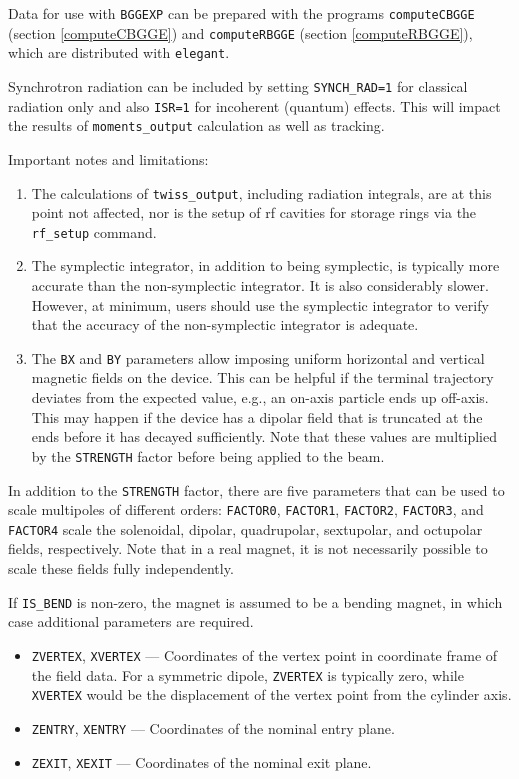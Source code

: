 Data for use with \verb|BGGEXP| can be prepared with the programs \verb|computeCBGGE| (section \ref{computeCBGGE})
and \verb|computeRBGGE| (section \ref{computeRBGGE}),
which are distributed with \verb|elegant|.

Synchrotron radiation can be included by setting \verb|SYNCH_RAD=1| for classical radiation only and
also \verb|ISR=1| for incoherent (quantum) effects. 
This will impact the results of \verb|moments_output| calculation as well as tracking.

Important notes and limitations:
\begin{enumerate}
\item The calculations of \verb|twiss_output|, including radiation integrals, are at this point not affected,
nor is the setup of rf cavities for storage rings via the \verb|rf_setup| command.
\item The symplectic integrator, in addition to being symplectic, is typically more accurate than the non-symplectic integrator.
  It is also considerably slower.
  However, at minimum, users should use the symplectic integrator to verify that the accuracy of the non-symplectic integrator
  is adequate.
\item The \verb|BX| and \verb|BY| parameters allow imposing uniform horizontal and vertical magnetic fields 
  on the device.
  This can be helpful if the terminal trajectory deviates from the expected value, e.g., an on-axis particle  
  ends up off-axis. This may happen if the device has
  a dipolar field that is truncated at the ends before it has decayed sufficiently.
  Note that these values are multiplied by the \verb|STRENGTH| factor before being applied to the beam.
\end{enumerate}

In addition to the \verb|STRENGTH| factor, there are five parameters that can be used to scale multipoles
of different orders: \verb|FACTOR0|, \verb|FACTOR1|, \verb|FACTOR2|, \verb|FACTOR3|, and \verb|FACTOR4| scale the
solenoidal, dipolar, quadrupolar, sextupolar, and octupolar fields, respectively.
Note that in a real magnet, it is not necessarily possible to scale these fields fully independently.

If \verb|IS_BEND| is non-zero, the magnet is assumed to be a bending magnet, in which case additional
parameters are required.
\begin{itemize}
\item \verb|ZVERTEX|, \verb|XVERTEX| --- Coordinates of the vertex point in coordinate frame of the field data.
  For a symmetric dipole, \verb|ZVERTEX| is typically zero, while \verb|XVERTEX| would be the displacement of
  the vertex point from the cylinder axis.
\item \verb|ZENTRY|, \verb|XENTRY| --- Coordinates of the nominal entry plane.
\item \verb|ZEXIT|, \verb|XEXIT| --- Coordinates of the nominal exit plane.
\end{itemize}
